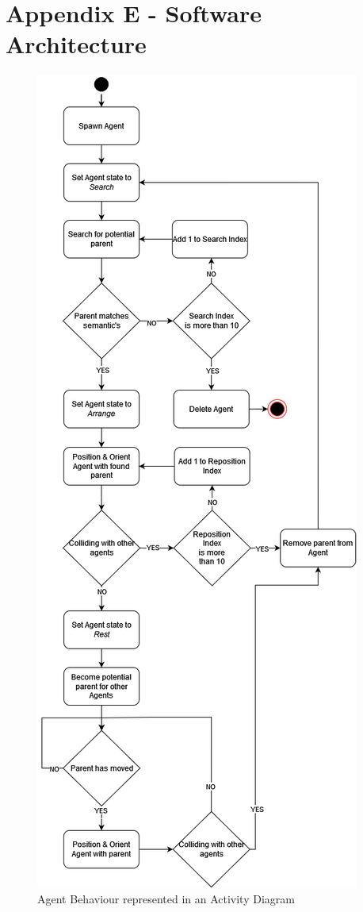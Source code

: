 \section*{Appendix E - Software Architecture} \label{append:e}
\begin{figure}[!h]
    \includegraphics[width=\columnwidth]{./Images/AgentActivityDiagram.png}
    \centering
    \caption{Agent Behaviour represented in an Activity Diagram}
    \label{activity-diagram}
\end{figure}

